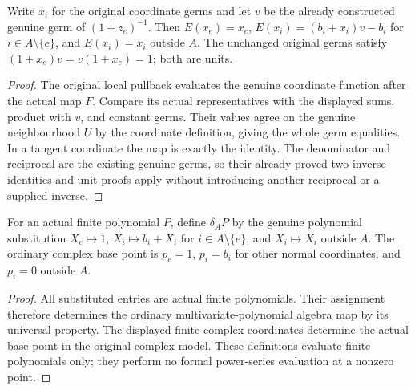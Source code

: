 \begin{theorem}
\label{hir:actual-normal-unit-coordinate-germ}
Write $x_i$ for the original coordinate germs and let $v$ be the
already constructed genuine germ of $(1+z_e)^{-1}$. Then
$E(x_e)=x_e$, $E(x_i)=(b_i+x_i)v-b_i$ for
$i\in A\setminus\{e\}$, and $E(x_i)=x_i$ outside $A$.
The unchanged original germs satisfy $(1+x_e)v=v(1+x_e)=1$;
both are units.
\leanok
\end{theorem}
\begin{proof}
The original local pullback evaluates the genuine coordinate function
after the actual map $F$. Compare its actual representatives with the
displayed sums, product with $v$, and constant germs. Their values agree
on the genuine neighbourhood $U$ by the coordinate definition, giving
the whole germ equalities. In a tangent coordinate the map is exactly
the identity. The denominator and reciprocal are the existing genuine
germs, so their already proved two inverse identities and unit proofs
apply without introducing another reciprocal or a supplied inverse.
\end{proof}

\begin{definition}
\label{hir:actual-normal-finite-dehomogenization}
For an actual finite polynomial $P$, define $\delta_A P$ by the genuine
polynomial substitution $X_e\mapsto1$,
$X_i\mapsto b_i+X_i$ for $i\in A\setminus\{e\}$,
and $X_i\mapsto X_i$ outside $A$. The ordinary complex base point is
$p_e=1$, $p_i=b_i$ for other normal coordinates, and $p_i=0$
outside $A$.
\leanok
\end{definition}
\begin{proof}
All substituted entries are actual finite polynomials. Their assignment
therefore determines the ordinary multivariate-polynomial algebra map
by its universal property. The displayed finite complex coordinates
determine the actual base point in the original complex model. These
definitions evaluate finite polynomials only; they perform no formal
power-series evaluation at a nonzero point.
\end{proof}

